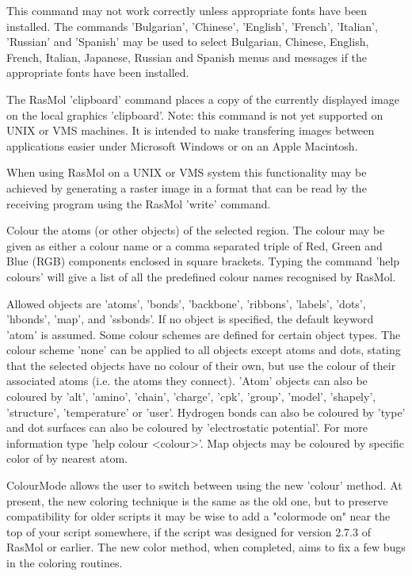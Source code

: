 This command may not work correctly unless appropriate fonts
have been installed.  The commands
'Bulgarian',
'Chinese',
'English',
'French',
'Italian',
'Russian'
and
'Spanish'
may be used to select Bulgarian, Chinese, English, French,
Italian, Japanese, Russian and Spanish menus and messages if the
appropriate fonts have been installed.

The RasMol
'clipboard'
command places a copy of the currently displayed image on the local
graphics 'clipboard'. Note: this command is not yet supported on
UNIX or VMS machines. It is intended to make transfering images
between applications easier under Microsoft Windows or on an Apple
Macintosh.

When using RasMol on a UNIX or VMS system this functionality may be
achieved by generating a raster image in a format that can be read
by the receiving program using the RasMol
'write'
command.

Colour the atoms (or other objects) of the selected region. The colour may
be given as either a colour name or a comma separated triple of Red, Green
and Blue (RGB) components enclosed in square brackets. Typing the command
'help colours'
will give a list of all the predefined colour names recognised
by RasMol.

Allowed objects are
'atoms',
'bonds',
'backbone',
'ribbons',
'labels',
'dots',
'hbonds',
'map',
and
'ssbonds'.
If no object is specified, the default keyword
'atom'
is assumed.
Some colour schemes are defined for certain object types. The colour scheme
'none'
can be applied to all objects except atoms and dots, stating that the selected
objects have no colour of their own, but use the colour of their associated
atoms (i.e. the atoms they connect).
'Atom'
objects can also be coloured by
'alt',
'amino',
'chain',
'charge',
'cpk',
'group',
'model',
'shapely',
'structure',
'temperature'
or
'user'.
Hydrogen bonds can also be coloured by
'type'
and dot surfaces can also be coloured by
'electrostatic potential'.
For more information type
'help colour <colour>'.
Map objects may be coloured by specific color of by nearest atom.

ColourMode allows the user to switch between using the new
'colour'
method. At present, the new coloring technique is the same as
the old one, but to preserve compatibility for older scripts
it may be wise to add a "colormode on" near the top of your
script somewhere, if the script was designed for version 2.7.3
of RasMol or earlier. The new color method, when completed,
aims to fix a few bugs in the coloring routines.

